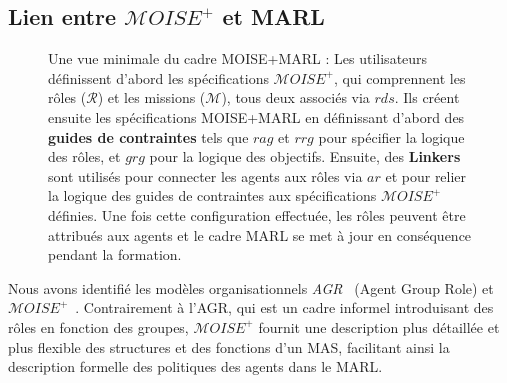 \subsection{Lien entre $\mathcal{M}OISE^+$ et MARL}

\begin{figure}[h!]
    \centering
    
    \caption{Une vue minimale du cadre MOISE+MARL :
        Les utilisateurs définissent d'abord les spécifications $\mathcal{M}OISE^+$, qui comprennent les rôles ($\mathcal{R}$) et les missions ($\mathcal{M}$), tous deux associés via $rds$. Ils créent ensuite les spécifications MOISE+MARL en définissant d'abord des \textbf{guides de contraintes} tels que $rag$ et $rrg$ pour spécifier la logique des rôles, et $grg$ pour la logique des objectifs.
        Ensuite, des \textbf{Linkers} sont utilisés pour connecter les agents aux rôles via $ar$ et pour relier la logique des guides de contraintes aux spécifications $\mathcal{M}OISE^+$ définies. Une fois cette configuration effectuée, les rôles peuvent être attribués aux agents et le cadre MARL se met à jour en conséquence pendant la formation.
    }
    \label{fig:mm_synthesis}
\end{figure}

Nous avons identifié les modèles organisationnels \textit{AGR}~\cite{ferber2003} (Agent Group Role) et $\mathcal{M}OISE^+$~\cite{Hubner2007}. Contrairement à l'AGR, qui est un cadre informel introduisant des rôles en fonction des groupes, $\mathcal{M}OISE^+$ fournit une description plus détaillée et plus flexible des structures et des fonctions d'un MAS, facilitant ainsi la description formelle des politiques des agents dans le MARL.

\

